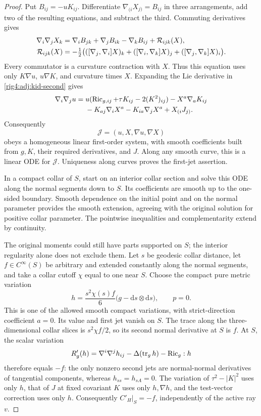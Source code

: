 \begin{proof}
Put $B_{ij}=-uK_{ij}$.  Differentiate
$\nabla_{(i}X_{j)}=B_{ij}$ in three arrangements, add two of the resulting
equations, and subtract the third.  Commuting derivatives gives
\begin{align}
 \nabla_i\nabla_jX_k
 &=\nabla_iB_{jk}+\nabla_jB_{ik}-\nabla_kB_{ij}
       +\mathcal R_{ijk}(X),\label{rig4:adj:prolongation-x}\\
 \mathcal R_{ijk}(X)
 &=-\tfrac12\bigl(
       ([\nabla_j,\nabla_i]X)_k
       +([\nabla_i,\nabla_k]X)_j
       +([\nabla_j,\nabla_k]X)_i\bigr).\notag
\end{align}
Every commutator is a curvature contraction with $X$.  Thus this equation
uses only $K\nabla u$, $u\nabla K$, and curvature times $X$.
Expanding the Lie derivative in \eqref{rig4:adj:kid-second} gives
\begin{align}
 \nabla_i\nabla_ju
 ={}&u(\operatorname{Ric}_{g,ij}+\tau K_{ij}-2(K^2)_{ij})-X^a\nabla_aK_{ij}
       \notag\\
 &-K_{aj}\nabla_iX^a-K_{ia}\nabla_jX^a+X_{(i}J_{j)}.
 \label{rig4:adj:prolongation-u}
\end{align}
Consequently
\[
 \mathcal J=(u,X,\nabla u,\nabla X)
\]
obeys a homogeneous linear first-order system, with smooth coefficients
built from $g,K$, their required derivatives, and $J$.  Along any smooth
curve, this is a linear ODE for $\mathcal J$.  Uniqueness along curves proves
the first-jet assertion.

In a compact collar of $S$, start on an interior collar section and solve
this ODE along the normal segments down to $S$.  Its coefficients are smooth
up to the one-sided boundary.  Smooth dependence on the initial point and on
the normal parameter provides the smooth extension, agreeing with the
original solution for positive collar parameter.  The pointwise inequalities
and complementarity extend by continuity.

The original moments could still have parts supported on $S$; the interior
regularity alone does not exclude them.  Let $s$ be geodesic collar distance,
let $f\in C^\infty(S)$ be arbitrary and extended constantly along the normal
segments, and take a collar cutoff $\chi$ equal to one near $S$.  Choose the
compact pure metric variation
\begin{equation}
 h=\frac{s^2\chi(s)f}{6}\bigl(g-\mathrm ds\otimes\mathrm ds\bigr),
 \qquad p=0.
 \label{rig4:adj:boundary-atom-test}
\end{equation}
This is one of the allowed smooth compact variations, with strict-direction
coefficient $a=0$.  Its value and first jet vanish on $S$.  The trace along
the three-dimensional collar slices is $s^2\chi f/2$, so its second normal
derivative at $S$ is $f$.  At $S$, the scalar variation
\[
 R'_g(h)=\nabla^i\nabla^jh_{ij}-\Delta(\operatorname{tr}_gh)-\operatorname{Ric}_g:h
\]
therefore equals $-f$: the only nonzero second jets are normal-normal
derivatives of tangential components, whereas $h_{ss}=h_{sA}=0$.
The variation of $\tau^2-|K|^2$ uses only $h$, that of $J$ at fixed covariant
$K$ uses only $h,\nabla h$, and the test-vector correction uses only $h$.
Consequently $C'_H|_S=-f$, independently of the active ray $v$.


\end{proof}
